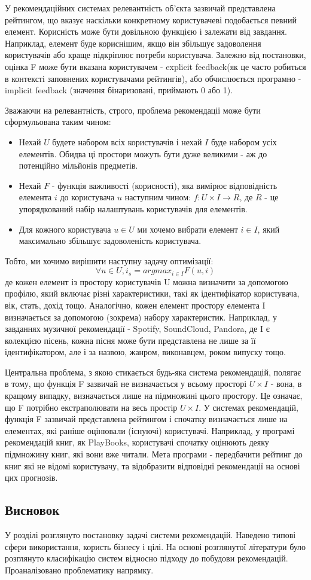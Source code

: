 У рекомендаційних системах релевантність об’єкта зазвичай представлена рейтингом, що вказує наскільки конкретному користувачеві подобається певний елемент. Корисність може бути довільною функцією і залежати від завдання.
Наприклад, елемент буде кориснішим, якщо він збільшує задоволення користувачів або краще підкріплює потреби користувача. Залежно від постановки, оцінка F може бути вказана користувачем - explicit feedback(як це часто робиться в контексті заповнених користувачами рейтингів), або обчислюється програмно - implicit feedback (значення бінаризовані, приймають 0 або 1).

Зважаючи на релевантність, строго, проблема рекомендації може бути сформульована таким чином:
\begin{itemize}
    \item Нехай $U$ будете набором всіх користувачів і нехай $I$ буде набором усіх елементів. Обидва ці простори можуть бути дуже великими - аж до потенційно мільйонів предметів.
    \item Нехай $F$ - функція важливості (корисності), яка вимірює відповідність елемента $i$ до користувача $u$ наступним чином: $f: U \times I \rightarrow R$,  де $R$ - це упорядкований набір налаштувань користувачів для елементів.
    \item Для кожного користувача $u \in U$ ми хочемо вибрати елемент $i \in I$, який максимально збільшує задоволеність користувача.
\end{itemize}

Тобто, ми хочимо вирішити наступну задачу оптимізації:
\[\forall u \in U, i_{s} = arg max_{i \in I}F(u,i)\]
де кожен елемент із простору користувачів U можна визначити за допомогою профілю, який включає різні характеристики, такі як ідентифікатор користувача, вік, стать, дохід тощо.
Аналогічно, кожен елемент простору елемента I визначається за допомогою (зокрема) набору характеристик. Наприклад, у завданнях музичної рекомендації -  Spotify, SoundCloud, Pandora, де I є колекцією пісень, кожна пісня може бути представлена не лише за її ідентифікатором, але і за назвою, жанром, виконавцем, роком випуску тощо.

Центральна проблема, з якою стикається будь-яка система рекомендацій, полягає в тому, що функція F зазвичай не визначається у всьому просторі $U \times I$ - вона, в кращому випадку, визначається лише на підмножині цього простору. Це означає, що F потрібно екстраполювати на весь простір $U \times I$.
У системах рекомендацій, функція F зазвичай представлена рейтингом і спочатку визначається лише на елементах, які раніше оцінювали (існуючі) користувачі. Наприклад, у програмі рекомендацій книг, як PlayBooks, користувачі спочатку оцінюють деяку підмножину книг, які вони вже читали. Мета програми - передбачити рейтинг до книг які не відомі користувачу, та відобразити відповідні рекомендації на основі цих прогнозів.

\subsection*{Висновок}
У розділі розглянуто постановку задачі системи рекомендацій. Наведено типові сфери використання, користь бізнесу і цілі. На основі розглянутої літератури було розглянуто класифікацію систем відносно підходу до побудови рекомендацій.
Проаналізовано проблематику напрямку.